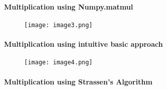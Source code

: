 \documentclass{article}
\begin{document}
\paragraph{Multiplication using Numpy.matmul}



\hfill 
\newline
\begin{figure}[H]
    \centering
    \texttt{[image: image3.png]}
\end{figure}
\paragraph{Multiplication using intuitive basic approach}

\hfill 
\newline
\begin{figure}[H]
    \centering
    \texttt{[image: image4.png]}
\end{figure}
\paragraph{Multiplication using Strassen's Algorithm}
\end{document}
